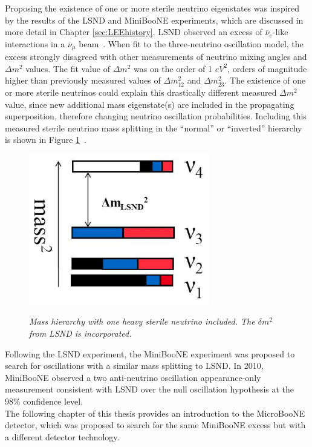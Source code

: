 Proposing the existence of one or more sterile neutrino eigenstates was inspired by the results of the LSND and MiniBooNE experiments, which are discussed in more detail in Chapter \ref{sec:LEEhistory}. LSND observed an excess of $\overline{\nu}_e$-like interactions in a $\overline{\nu}_\mu$ beam~\cite{LSNDPaper}. When fit to the three-neutrino oscillation model, the excess strongly disagreed with other measurements of neutrino mixing angles and $\Delta m^2$ values. The fit value of $\Delta m^2$ was on the order of 1 $eV^2$, orders of magnitude higher than previously measured values of $\Delta m_{12}^2$ and $\Delta m_{23}^2$. The existence of one or more sterile neutrinos could explain this drastically different measured $\Delta m^2$ value, since new additional mass eigenstate(s) are included in the propagating superposition, therefore changing neutrino oscillation probabilities. Including this measured sterile neutrino mass splitting in the ``normal'' or ``inverted'' hierarchy is shown in Figure \ref{sterile_nu_hierarchy_fig}~\cite{GaryThesis}.\\

\begin{figure}[ht!]
\centering
	\includegraphics[width=0.7\textwidth]{Figures/sterile_masssplitting.png} \\
\caption{\textit{Mass hierarchy with one heavy sterile neutrino included. The $\delta m^2$ from LSND is incorporated.}}\label{sterile_nu_hierarchy_fig}
\end{figure}

Following the LSND experiment, the MiniBooNE experiment was proposed to search for oscillations with a similar mass splitting to LSND. In 2010, MiniBooNE observed a two anti-neutrino oscillation appearance-only measurement consistent with LSND over the null oscillation hypothesis at the 98\% confidence level.\\

The following chapter of this thesis provides an introduction to the MicroBooNE detector, which was proposed to search for the same MiniBooNE excess but with a different detector technology.
